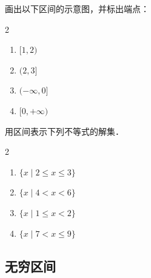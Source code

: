 \begin{exercise}
    画出以下区间的示意图，并标出端点：
    \begin{multicols}{2}
        \begin{enumerate}
            \item $[1, 2)$
            \item $(2, 3]$
                  \columnbreak
            \item $(-\infty, 0]$
            \item $[0, +\infty)$
        \end{enumerate}
    \end{multicols}
\end{exercise}

\begin{problem}
用区间表示下列不等式的解集．
\begin{multicols}{2}
    \begin{enumerate}
        \item $\{x \mid 2 \leq x \leq 3\}$
        \item $\{x \mid 4<x<6\}$
              \columnbreak
        \item $\{x \mid 1 \leq x<2\}$
        \item $\{x \mid 7<x \leq 9\}$
    \end{enumerate}
\end{multicols}
\end{problem}

\subsection{无穷区间}

